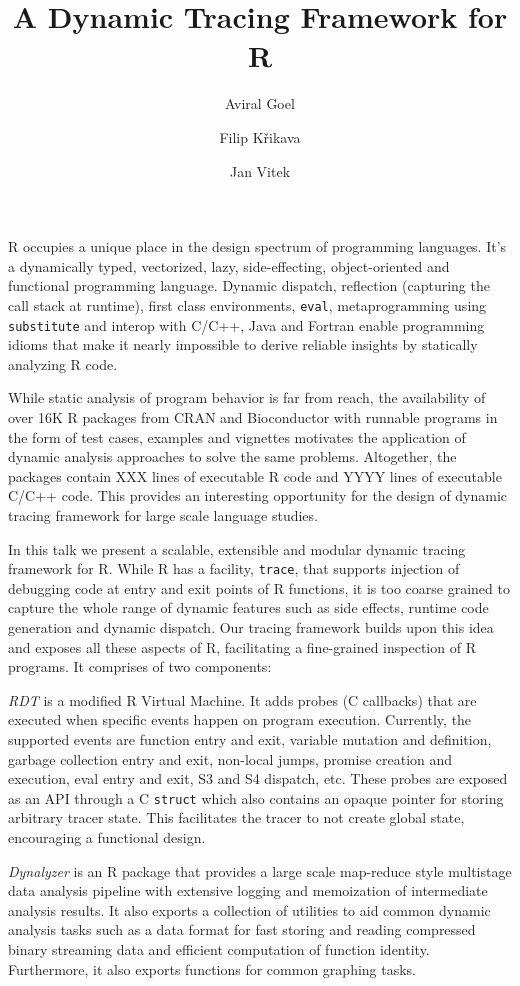 \documentclass[acmsmall,review]{acmart}
\title{A Dynamic Tracing Framework for R}
\author{Aviral Goel}
\affiliation{
  \institution{Northeastern University}
  \country{Czech Republic}
}
\author{Filip Křikava}
\affiliation{
  \institution{Czech Technical University}
  \country{Czechia}
}
\author{Jan Vitek}
\affiliation{
  \institution{Northeastern University}
  \country{Czech Republic}
}
\affiliation{
  \institution{Czech Technical University}
  \country{Czechia}
}
\newcommand{\code}[1]{\lstinline|#1|\xspace}
\begin{document}
\maketitle

R occupies a unique place in the design spectrum of programming languages. It’s
a dynamically typed, vectorized, lazy, side-effecting, object-oriented and
functional programming language. Dynamic dispatch, reflection (capturing the
call stack at runtime), first class environments, \code{eval}, metaprogramming
using \code{substitute} and interop with C/C++, Java and Fortran enable programming
idioms that make it nearly impossible to derive reliable insights by
statically analyzing R code.

While static analysis of program behavior is far from reach, the availability of
over 16K R packages from CRAN and Bioconductor with runnable programs in the
form of test cases, examples and vignettes motivates the application of dynamic
analysis approaches to solve the same problems. Altogether, the packages contain
XXX lines of executable R code and YYYY lines of executable C/C++ code. This
provides an interesting opportunity for the design of dynamic tracing framework
for large scale language studies.

In this talk we present a scalable, extensible and modular dynamic tracing
framework for R. While R has a facility, \code{trace}, that supports injection
of debugging code at entry and exit points of R functions, it is too coarse
grained to capture the whole range of dynamic features such as side effects,
runtime code generation and dynamic dispatch. Our tracing framework builds upon
this idea and exposes all these aspects of R, facilitating a fine-grained
inspection of R programs. It comprises of two components:
\begin{compactitem}[$-$]
\item \emph{RDT} is a modified R Virtual Machine. It adds probes (C callbacks)
  that are executed when specific events happen on program execution. Currently,
  the supported events are function entry and exit, variable mutation and
  definition, garbage collection entry and exit, non-local jumps, promise
  creation and execution, eval entry and exit, S3 and S4 dispatch, etc. These
  probes are exposed as an API through a C \code{struct} which also contains
  an opaque pointer for storing arbitrary tracer state. This facilitates the
  tracer to not create global state, encouraging a functional design.
\item \emph{Dynalyzer} is an R package that provides a large scale map-reduce
  style multistage data analysis pipeline with extensive logging and memoization
  of intermediate analysis results. It also exports a collection of utilities to aid
  common dynamic analysis tasks such as a data format for fast storing and
  reading compressed binary streaming data and efficient computation of function
  identity. Furthermore, it also exports functions for common graphing tasks.
\end{compactitem}
\end{document}
